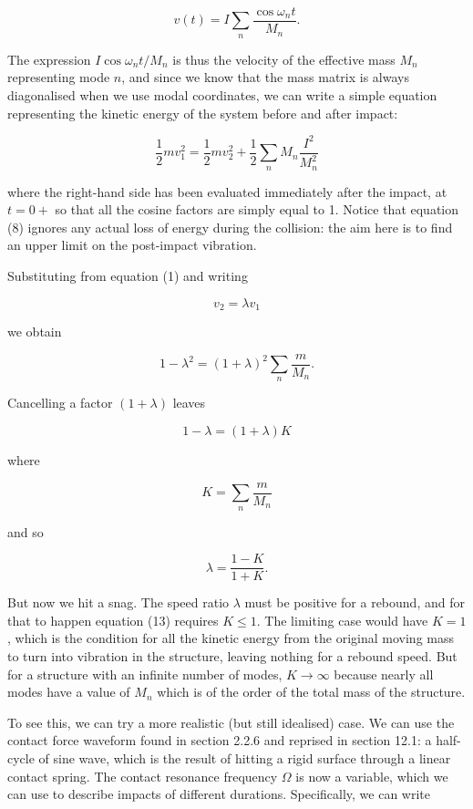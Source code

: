   $$v(t) = I \sum_n{\dfrac{\cos \omega_n t}{M_n}} . \tag{7}$$ 

  The expression $I \cos \omega_n t /M_n$ is thus the velocity of the effective 
  mass $M_n$ representing mode $n$, and since we know that the mass matrix is 
  always diagonalised when we use modal coordinates, we can write a simple 
  equation representing the kinetic energy of the system before and after 
  impact: 

  $$\frac{1}{2}m v_1^2 = \frac{1}{2}m v_2^2 +\frac{1}{2} \sum_n{M_n 
  \dfrac{I^2}{M_n^2}} \tag{8}$$ 

  where the right-hand side has been evaluated immediately after the impact, at 
  $t=0+$ so that all the cosine factors are simply equal to 1. Notice that 
  equation (8) ignores any actual loss of energy during the collision: the aim 
  here is to find an upper limit on the post-impact vibration. 

  Substituting from equation (1) and writing 

  $$v_2= \lambda v_1 \tag{9}$$ 

  we obtain 

  $$1- \lambda^2 = (1+\lambda)^2 \sum_n{\dfrac{m}{M_n}} . \tag{10}$$ 

  Cancelling a factor $(1+ \lambda)$ leaves 

  $$1-\lambda = (1+\lambda)K \tag{11}$$ 

  where 

  $$K=\sum_n{\dfrac{m}{M_n}} \tag{12}$$ 

  and so 

  $$\lambda = \dfrac{1-K}{1+K}. \tag{13}$$ 

  But now we hit a snag. The speed ratio $\lambda$ must be positive for a 
  rebound, and for that to happen equation (13) requires $K \le 1$. The 
  limiting case would have $K=1$, which is the condition for all the kinetic 
  energy from the original moving mass to turn into vibration in the structure, 
  leaving nothing for a rebound speed. But for a structure with an infinite 
  number of modes, $K \rightarrow \infty$ because nearly all modes have a value 
  of $M_n$ which is of the order of the total mass of the structure. 

  To see this, we can try a more realistic (but still idealised) case. We can 
  use the contact force waveform found in section 2.2.6 and reprised in section 
  12.1: a half-cycle of sine wave, which is the result of hitting a rigid 
  surface through a linear contact spring. The contact resonance frequency 
  $\Omega$ is now a variable, which we can use to describe impacts of different 
  durations. Specifically, we can write 

